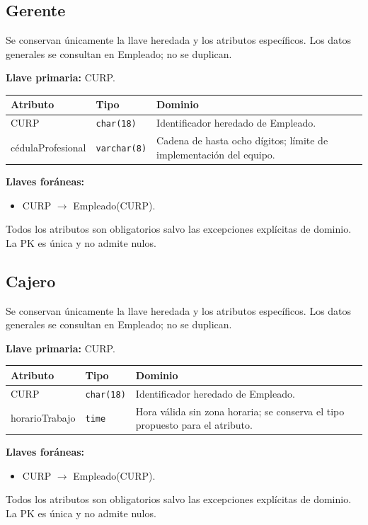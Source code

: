 \par\noindent\begin{minipage}{\textwidth}
\subsection{Gerente}
Se conservan únicamente la llave heredada y los atributos específicos. Los datos generales se consultan en Empleado; no se duplican.\par
\textbf{Llave primaria:} CURP.\par
{\small\begin{tabular}{@{}p{}p{}p{}@{}}
\toprule Atributo & Tipo & Dominio \\ \midrule
CURP & \texttt{char(18)} & Identificador heredado de Empleado. \\
cédulaProfesional & \texttt{varchar(8)} & Cadena de hasta ocho dígitos; límite de implementación del equipo. \\
\bottomrule\end{tabular}}
\textbf{Llaves foráneas:}\begin{itemize}[nosep]
\item CURP $\rightarrow$ Empleado(CURP).
\end{itemize}
Todos los atributos son obligatorios salvo las excepciones explícitas de dominio. La PK es única y no admite nulos.
\end{minipage}\par\vspace{.35cm}
\par\noindent\begin{minipage}{\textwidth}
\subsection{Cajero}
Se conservan únicamente la llave heredada y los atributos específicos. Los datos generales se consultan en Empleado; no se duplican.\par
\textbf{Llave primaria:} CURP.\par
{\small\begin{tabular}{@{}p{}p{}p{}@{}}
\toprule Atributo & Tipo & Dominio \\ \midrule
CURP & \texttt{char(18)} & Identificador heredado de Empleado. \\
horarioTrabajo & \texttt{time} & Hora válida sin zona horaria; se conserva el tipo propuesto para el atributo. \\
\bottomrule\end{tabular}}
\textbf{Llaves foráneas:}\begin{itemize}[nosep]
\item CURP $\rightarrow$ Empleado(CURP).
\end{itemize}
Todos los atributos son obligatorios salvo las excepciones explícitas de dominio. La PK es única y no admite nulos.
\end{minipage}\par\vspace{.35cm}
